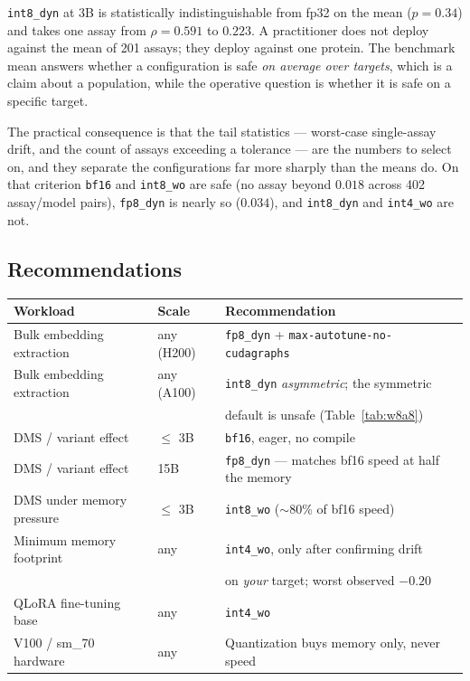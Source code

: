 \documentclass[11pt]{article}
\newcommand{\cfg}[1]{\texttt{#1}}
\begin{document}
\cfg{int8\_dyn} at 3B is statistically indistinguishable from fp32 on the mean
($p = 0.34$) and takes one assay from $\rho = 0.591$ to $0.223$. A practitioner
does not deploy against the mean of 201 assays; they deploy against one protein.
The benchmark mean answers whether a configuration is safe \emph{on average over
targets}, which is a claim about a population, while the operative question is
whether it is safe on a specific target.

The practical consequence is that the tail statistics --- worst-case single-assay
drift, and the count of assays exceeding a tolerance --- are the numbers to
select on, and they separate the configurations far more sharply than the means
do. On that criterion \cfg{bf16} and \cfg{int8\_wo} are safe (no assay beyond
$0.018$ across 402 assay/model pairs), \cfg{fp8\_dyn} is nearly so ($0.034$), and
\cfg{int8\_dyn} and \cfg{int4\_wo} are not.

\subsection{Recommendations}

\begin{table}[htb]
\centering
\small
\begin{tabular}{lll}
\toprule
Workload & Scale & Recommendation \\
\midrule
Bulk embedding extraction & any (H200)  & \cfg{fp8\_dyn} + \texttt{max-autotune-no-cudagraphs} \\
Bulk embedding extraction & any (A100)  & \cfg{int8\_dyn} \emph{asymmetric}; the symmetric \\
                          &             & \quad default is unsafe (Table~\ref{tab:w8a8}) \\
DMS / variant effect      & $\leq$ 3B   & \cfg{bf16}, eager, no compile \\
DMS / variant effect      & 15B         & \cfg{fp8\_dyn} --- matches bf16 speed at half the memory \\
DMS under memory pressure & $\leq$ 3B   & \cfg{int8\_wo} ($\sim$80\% of bf16 speed) \\
Minimum memory footprint  & any         & \cfg{int4\_wo}, only after confirming drift \\
                          &             & \quad on \emph{your} target; worst observed $-0.20$ \\
QLoRA fine-tuning base    & any         & \cfg{int4\_wo} \\
V100 / sm\_70 hardware    & any         & Quantization buys memory only, never speed \\
\bottomrule
\end{tabular}
\end{table}
\end{document}
